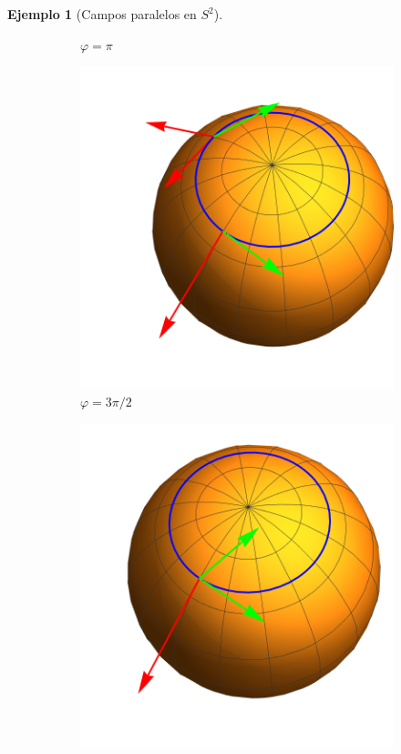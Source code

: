 \documentclass[spanish]{book}
\theoremstyle{definition}
\newtheorem*{ejem}{Ejemplo}
\begin{document}
\begin{ejem}[Campos paralelos en $S^2$]
\begin{figure}[H]
\begin{center}
\begin{subfigure}[t]{0.4\linewidth}
					\caption*{$\varphi=\pi$}
				\end{subfigure}
				\begin{subfigure}[t]{0.4\linewidth}
					\centering
					\includegraphics[width=\linewidth]{fig15e}
					\caption*{$\varphi=3\pi/2$}
				\end{subfigure}
				\begin{subfigure}[t]{0.4\linewidth}
					\centering
					\includegraphics[width=\linewidth]{fig15f}

\end{subfigure}
\end{center}
\end{figure}
\end{ejem}
\end{document}
